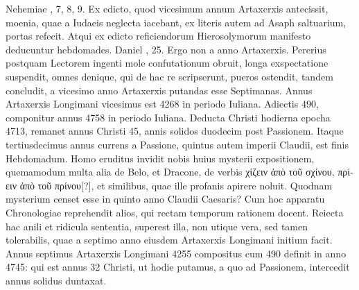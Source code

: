 Nehemiae , 7, 8, 9.
Ex edicto, quod vicesimum
annum Artaxerxis antecissit, moenia, quae a Iudaeis neglecta
iacebant, ex literis autem ad Asaph saltuarium, portas refecit.
Atqui ex edicto reficiendorum Hierosolymorum manifesto deducuntur
hebdomades.
Daniel , 25.
Ergo non a  anno Artaxerxis.
Pererius postquam Lectorem ingenti mole confutationum
obruit, longa exspectatione suspendit, omnes denique, qui
de hac re scripserunt, pueros ostendit, tandem concludit, a vicesimo
anno Artaxerxis putandas esse Septimanas.
Annus Artaxerxis
Longimani vicesimus est 4268 in periodo Iuliana.
Adiectis 490,
componitur annus 4758 in periodo Iuliana.
Deducta Christi hodierna
epocha 4713, remanet annus Christi 45, annis solidos duodecim
post Passionem.
Itaque tertiusdecimus annus currens a Passione,
quintus autem imperii Claudii, est finis Hebdomadum.
Homo eruditus invidit nobis huius mysterii expositionem, quemamodum
multa alia de Belo, et Dracone, de verbis \textgreek{χίζειν ἀπὸ τοῦ σχίνου,
πρίειν ἀπὸ τοῦ πρίνου[?]}, et similibus, quae ille profanis apirere noluit.
Quodnam mysterium censet esse in quinto anno Claudii Caesaris?
Cum hoc apparatu Chronologiae reprehendit alios, qui rectam
temporum rationem docent.
Reiecta hac anili et ridicula sententia,
superest illa, non utique vera, sed tamen tolerabilis, quae a
septimo anno eiusdem Artaxerxis Longimani initium facit.
Annus septimus Artaxerxis Longimani 4255 compositus cum 490
definit in anno 4745: qui est annus 32 Christi, ut hodie putamus,
a quo ad Passionem, intercedit annus solidus duntaxat.
